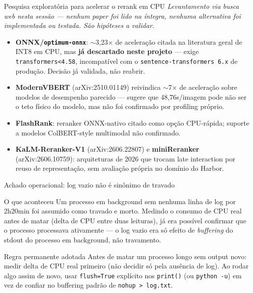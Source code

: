 \documentclass{beamer}
\newenvironment{numerobloco}[1]{\begin{block}{#1}}{\end{block}}
\newenvironment{decisaobloco}[1]{\begin{alertblock}{#1}}{\end{alertblock}}
\begin{document}
\begin{frame}{Pesquisa exploratória para acelerar o rerank em CPU}
  \footnotesize
  \textit{Levantamento via busca web nesta sessão — nenhum paper foi lido na íntegra,
  nenhuma alternativa foi implementada ou testada. São hipóteses a validar.}
  \begin{itemize}
    \item \textbf{ONNX/\texttt{optimum-onnx}}: $\sim$3,23$\times$ de aceleração citada
      na literatura geral de INT8 em CPU, mas \textbf{já descartado neste projeto} —
      exige \texttt{transformers<4.58}, incompatível com o
      \texttt{sentence-transformers 6.x} de produção. Decisão já validada, não reabrir.
    \item \textbf{ModernVBERT} (arXiv:2510.01149) reivindica $\sim$7$\times$ de
      aceleração sobre modelos de desempenho parecido — sugere que 48,76s/imagem pode
      não ser o teto físico do modelo, mas não foi confirmado por profiling próprio.
    \item \textbf{FlashRank}: reranker ONNX-nativo citado como opção CPU-rápida;
      suporte a modelos ColBERT-style multimodal não confirmado.
    \item \textbf{KaLM-Reranker-V1} (arXiv:2606.22807) e \textbf{miniReranker}
      (arXiv:2606.10759): arquiteturas de 2026 que trocam late interaction por reuso de
      representação, sem avaliação própria no domínio do Harbor.
  \end{itemize}
\end{frame}

\begin{frame}{Achado operacional: log vazio não é sinônimo de travado}
  \begin{numerobloco}{O que aconteceu}
    Um processo em background sem nenhuma linha de log por 2h20min foi assumido como
    travado e morto. Medindo o consumo de CPU real antes de matar (delta de CPU entre
    duas leituras), já era possível confirmar que o processo processava ativamente —
    o log vazio era só efeito de \emph{buffering} do stdout do processo em background,
    não travamento.
  \end{numerobloco}

  \pause
  \begin{decisaobloco}{Regra permanente adotada}
    Antes de matar um processo longo sem output novo: medir delta de CPU real primeiro
    (não decidir só pela ausência de log). Ao rodar algo assim de novo, usar
    \texttt{flush=True} explícito nos \texttt{print()} (ou \texttt{python -u}) em vez
    de confiar no buffering padrão de \texttt{nohup > log.txt}.
  \end{decisaobloco}
\end{frame}
\end{document}
